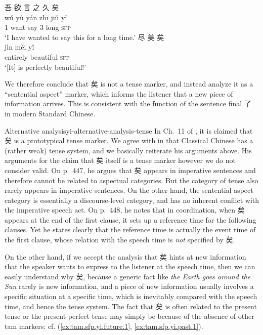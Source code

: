 \documentclass[UTF8, a4paper, oneside, scheme=plain, 12pt]{ctexrep}
\newcommand*{\citechap}[1]{Ch.~{#1}}
\newcommand*{\citepage}[1]{p.~{#1}}
\newcommand{\form}[1]{\emph{#1}}
\newcommand{\translate}[1]{`#1'}
\newcommand*{\category}[1]{\textsc{#1}}
\begin{document}
\begin{exe}
    \ex\label{ex:tam.sfp.yi.attitude.1}
    \glll 吾 欲 言 之 久 矣 \\
    wú yù yán zhī jiǔ yǐ \\
    1 want say 3 long \category{sfp} \\
    \glt\translate{I have wanted to say this for a long time.}
    \ex\label{ex:tam.sfp.yi.attitude.2}
    \glll 尽 美 矣 \\
    jìn měi yǐ \\
    entirely beautiful \category{sfp} \\
    \glt\translate{[It] is perfectly beautiful!}
\end{exe}

We therefore conclude that 矣 is not a tense marker,
and instead analyze it as a ``sentential aspect'' marker,
which informs the listener that a new piece of information arrives.
This is consistent with the function of the sentence final 了 in modern Standard Chinese.

\begin{infobox}{Alternative analysis}{yi-alternative-analysis-tense}
    In \citechap{11} of \citet{meiguang2018}, it is claimed that 矣 is a prototypical tense marker.
    We agree with \citet{meiguang2018} in that Classical Chinese has a (rather weak) tense system, and we basically reiterate his arguments above.
    His arguments for the claim that 矣 itself is a tense marker however we do not consider valid.
    On \citepage{447}, he argues that 矣 appears in imperative sentences and therefore cannot be related to aspectual categories.
    But the category of tense also rarely appears in imperative sentences.
    On the other hand, the sentential aspect category is essentially a discourse-level category, and has no inherent conflict with the imperative speech act.
    On \citepage{448}, he notes that in coordination, when 矣 appears at the end of the first clause, it sets up a reference time for the following clauses.
    Yet he states clearly that the reference time is actually the event time of the first clause,
    whose relation with the speech time is \emph{not} specified by 矣.

    On the other hand, if we accept the analysis that 矣 hints at new information that the speaker wants to express to the listener at the speech time,
    then we can easily understand why 矣,
    because a generic fact like \form{the Earth goes around the Sun} rarely is new information,
    and a piece of new information usually involves a specific situation at a specific time,
    which is inevitably compared with the speech time, and hence the tense system.
    The fact that 矣 is often related to the present tense or the present perfect tense 
    may simply be because of the absence of other \ac{tam} markers:
    cf. (\ref{ex:tam.sfp.yi.future.1}, \ref{ex:tam.sfp.yi.past.1}).
\end{infobox}
\end{document}
